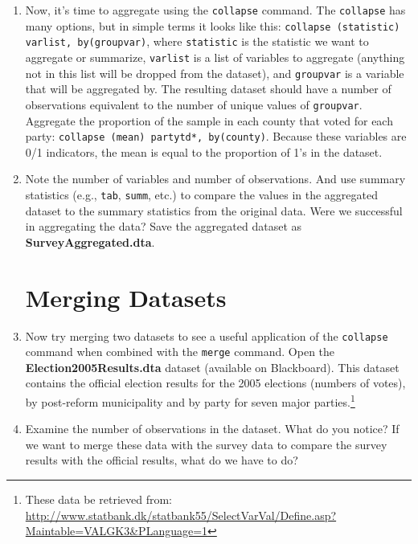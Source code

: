\documentclass[a4paper,12pt]{article}
\begin{document}
\begin{enumerate}
\item Now, it's time to aggregate using the \texttt{collapse} command. The \texttt{collapse} has many options, but in simple terms it looks like this: \texttt{collapse (statistic) varlist, by(groupvar)}, where \texttt{statistic} is the statistic we want to aggregate or summarize, \texttt{varlist} is a list of variables to aggregate (anything not in this list will be dropped from the dataset), and \texttt{groupvar} is a variable that will be aggregated by. The resulting dataset should have a number of observations equivalent to the number of unique values of \texttt{groupvar}. Aggregate the proportion of the sample in each county that voted for each party: \texttt{collapse (mean) partytd*, by(county)}. Because these variables are 0/1 indicators, the mean is equal to the proportion of 1's in the dataset.

\item Note the number of variables and number of observations. And use summary statistics (e.g., \texttt{tab}, \texttt{summ}, etc.) to compare the values in the aggregated dataset to the summary statistics from the original data. Were we successful in aggregating the data? Save the aggregated dataset as \textbf{SurveyAggregated.dta}. 

\section*{Merging Datasets}



\item Now try merging two datasets to see a useful application of the \texttt{collapse} command when combined with the \texttt{merge} command. Open the \textbf{Election2005Results.dta} dataset (available on Blackboard). This dataset contains the official election results for the 2005 elections (numbers of votes), by post-reform municipality and by party for seven major parties.\footnote{These data be retrieved from: \url{http://www.statbank.dk/statbank55/SelectVarVal/Define.asp?Maintable=VALGK3&PLanguage=1}}

\item Examine the number of observations in the dataset. What do you notice? If we want to merge these data with the survey data to compare the survey results with the official results, what do we have to do?


\end{enumerate}
\end{document}

